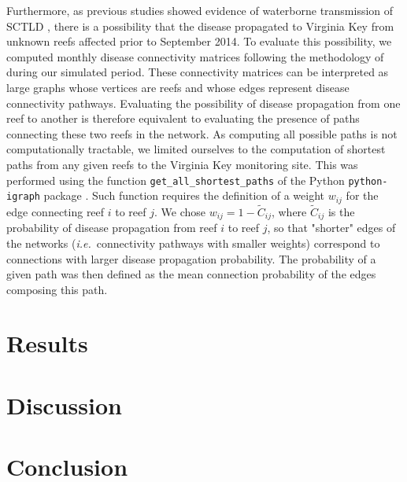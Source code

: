 \documentclass[preprint,12pt,authoryear]{elsarticle}
\newcommand{\ie}{{\it i.e.}\ }
\begin{document}
Furthermore, as previous studies showed evidence of waterborne transmission of SCTLD \citep{aeby2019pathogenesis, dobbelaere2020coupled,eaton2021measuring, meiling2021variable}, there is a possibility that the disease propagated to Virginia Key from unknown reefs affected prior to September 2014. To evaluate this possibility, we computed monthly disease connectivity matrices following the methodology of \cite{dobbelaere2020coupled} during our simulated period. These connectivity matrices can be interpreted as large graphs whose vertices are reefs and whose edges represent disease connectivity pathways. Evaluating the possibility of disease propagation from one reef to another is therefore equivalent to evaluating the presence of paths connecting these two reefs in the network. As computing all possible paths is not computationally tractable, we limited ourselves to the computation of shortest paths from any given reefs to the Virginia Key monitoring site. This was performed using the function \texttt{get\_all\_shortest\_paths} of the Python \texttt{python-igraph} package \citep{csardi2006igraph}. Such function requires the definition of a weight $w_{ij}$ for the edge connecting reef $i$ to reef $j$. We chose $w_{ij} = 1-\tilde{C}_{ij}$, where $\tilde{C}_{ij}$ is the probability of disease propagation from reef $i$ to reef $j$, so that "shorter" edges of the networks (\ie connectivity pathways with smaller weights) correspond to connections with larger disease propagation probability. The probability of a given path was then defined as the mean connection probability of the edges composing this path.
  
\section{Results}

\section{Discussion}

\section{Conclusion}


 

\end{document}
